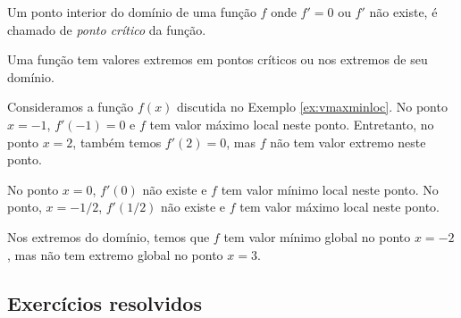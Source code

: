 Um ponto interior do domínio de uma função $f$ onde $f'=0$ ou $f'$ não existe, é chamado de \emph{ponto crítico} da função.

\begin{obs}\label{obs:pt_critico_val_extremo}
  Uma função tem valores extremos em pontos críticos ou nos extremos de seu domínio.
\end{obs}


\begin{ex}
  Consideramos a função $f(x)$ discutida no Exemplo \ref{ex:vmaxminloc}. No ponto $x=-1$, $f'(-1)=0$ e $f$ tem valor máximo local neste ponto. Entretanto, no ponto $x=2$, também temos $f'(2)=0$, mas $f$ não tem valor extremo neste ponto.

  No ponto $x=0$, $f'(0)$ não existe e $f$ tem valor mínimo local neste ponto. No ponto, $x=-1/2$, $f'(1/2)$ não existe e $f$ tem valor máximo local neste ponto.

  Nos extremos do domínio, temos que $f$ tem valor mínimo global no ponto $x=-2$, mas não tem extremo global no ponto $x=3$.
\end{ex}

\subsection*{Exercícios resolvidos}

